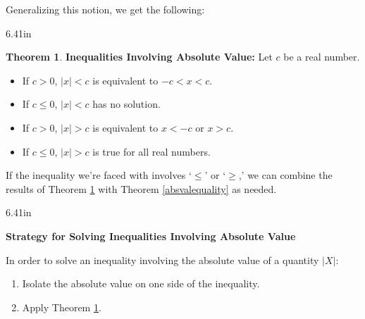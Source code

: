 \documentclass[11pt]{article}
\theoremstyle{definition}  %
\newtheorem{thm}{\bf Theorem}
\newcommand{\bbm}{\begin{boxedminipage}{6.41in}}
\newcommand{\ebm}{\end{boxedminipage}}
\begin{document}
Generalizing this notion, we get the following:

\medskip

\colorbox{ResultColor}{\bbm
\begin{thm}  \label{absolutevalueineq} \textbf{Inequalities Involving Absolute Value:}  Let $c$ be a real number.  

\begin{itemize}

\item   If $c> 0$, $|x| < c$ is equivalent to $-c<x<c$.

\item  If $c \leq 0$, $|x| < c$ has no solution.

\item  If $c > 0$, $|x| > c$ is equivalent to $x < -c$ or $x > c$.

\item If $c \leq 0$, $|x| > c$ is true for all real numbers.

\end{itemize}

\end{thm}
\ebm}

\medskip

If the inequality we're faced with involves `$\leq$' or `$\geq$,' we can combine the results of Theorem \ref{absolutevalueineq}  with Theorem \ref{absvalequality} as needed. 

\medskip

\label{strategyforsolvingabsineq}

\colorbox{ResultColor}{\bbm

\centerline{\textbf{Strategy for Solving Inequalities Involving  Absolute Value}}

\vspace{0.05in}

In order to solve an inequality involving the absolute value of a quantity $|X|$:

\begin{enumerate}

\item  Isolate the absolute value on one side of the inequality.

\item  Apply Theorem \ref{absolutevalueineq}.

\end{enumerate}

\ebm}

\medskip
\end{document}
